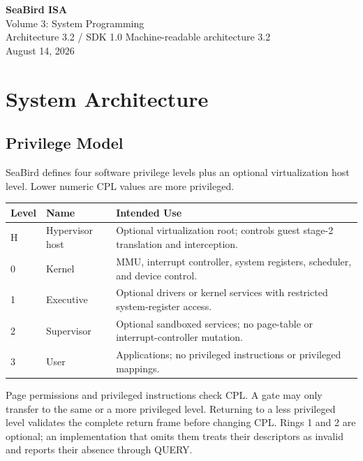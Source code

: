 \documentclass[11pt]{article}
\begin{document}
\begin{titlepage}\centering\vspace*{2cm}
{\Huge\bfseries SeaBird ISA\\[0.3cm]}{\LARGE Volume 3: System Programming\\[0.5cm]}
{\Large Architecture 3.2 / SDK 1.0}\vfill
{\large Machine-readable architecture 3.2\\August 14, 2026}\vfill
\end{titlepage}
\tableofcontents\clearpage
\section{System Architecture}

\subsection{Privilege Model}

SeaBird defines four software privilege levels plus an optional virtualization host level. Lower numeric CPL values are more privileged.

\begin{table}[h]
\centering
\begin{tabular}{@{}L{1.4cm}L{2.8cm}L{7.8cm}@{}}
\toprule
\textbf{Level} & \textbf{Name} & \textbf{Intended Use} \\ \midrule
H & Hypervisor host & Optional virtualization root; controls guest stage-2 translation and interception. \\
0 & Kernel & MMU, interrupt controller, system registers, scheduler, and device control. \\
1 & Executive & Optional drivers or kernel services with restricted system-register access. \\
2 & Supervisor & Optional sandboxed services; no page-table or interrupt-controller mutation. \\
3 & User & Applications; no privileged instructions or privileged mappings. \\ \bottomrule
\end{tabular}
\end{table}

Page permissions and privileged instructions check CPL. A gate may only transfer to the same or a more privileged level. Returning to a less privileged level validates the complete return frame before changing CPL. Rings 1 and 2 are optional; an implementation that omits them treats their descriptors as invalid and reports their absence through QUERY.
\end{document}
